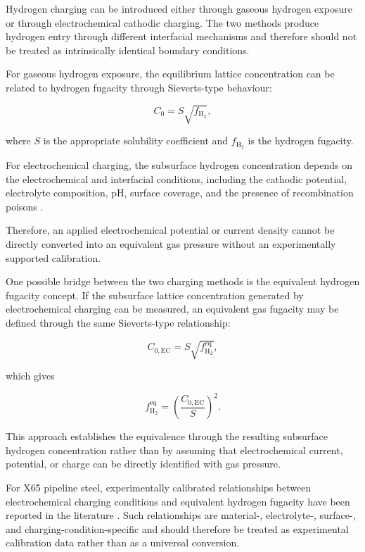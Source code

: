 Hydrogen charging can be introduced either through gaseous hydrogen
exposure or through electrochemical cathodic charging. The two
methods produce hydrogen entry through different interfacial
mechanisms and therefore should not be treated as intrinsically
identical boundary conditions.

For gaseous hydrogen exposure, the equilibrium lattice concentration
can be related to hydrogen fugacity through Sieverts-type behaviour:

\begin{equation}
C_0
=
S
\sqrt{f_{\mathrm{H_2}}},
\label{eq:ch3_sieverts}
\end{equation}

where $S$ is the appropriate solubility coefficient and
$f_{\mathrm{H_2}}$ is the hydrogen fugacity.

For electrochemical charging, the subsurface hydrogen concentration
depends on the electrochemical and interfacial conditions, including
the cathodic potential, electrolyte composition, pH, surface
coverage, and the presence of recombination poisons
\cite{Turnbull2014,Koren2024a}.

Therefore, an applied electrochemical potential or current density
cannot be directly converted into an equivalent gas pressure without
an experimentally supported calibration.

One possible bridge between the two charging methods is the
equivalent hydrogen fugacity concept. If the subsurface lattice
concentration generated by electrochemical charging can be measured,
an equivalent gas fugacity may be defined through the same
Sieverts-type relationship:

\begin{equation}
C_{0,\mathrm{EC}}
=
S
\sqrt{
f_{\mathrm{H_2}}^{\mathrm{eq}}
},
\label{eq:ch3_equivalent_fugacity}
\end{equation}

which gives

\begin{equation}
f_{\mathrm{H_2}}^{\mathrm{eq}}
=
\left(
\frac{C_{0,\mathrm{EC}}}{S}
\right)^2.
\label{eq:ch3_equivalent_fugacity_expanded}
\end{equation}

This approach establishes the equivalence through the resulting
subsurface hydrogen concentration rather than by assuming that
electrochemical current, potential, or charge can be directly
identified with gas pressure.

For X65 pipeline steel, experimentally calibrated relationships
between electrochemical charging conditions and equivalent hydrogen
fugacity have been reported in the literature
\cite{Koren2023a,Koren2024a}. Such relationships are material-,
electrolyte-, surface-, and charging-condition-specific and should
therefore be treated as experimental calibration data rather than as a
universal conversion.

